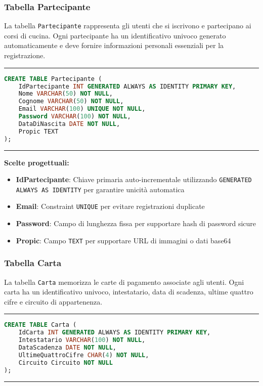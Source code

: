 \subsubsection{Tabella Partecipante}

La tabella \texttt{Partecipante} rappresenta gli utenti che si iscrivono e partecipano ai corsi di cucina. Ogni partecipante ha un identificativo univoco generato automaticamente e deve fornire informazioni personali essenziali per la registrazione.

\noindent\rule{\textwidth}{0.4pt}
\begin{lstlisting}[language=SQL, style=sqlstyle]
CREATE TABLE Partecipante (
    IdPartecipante INT GENERATED ALWAYS AS IDENTITY PRIMARY KEY,
    Nome VARCHAR(50) NOT NULL,
    Cognome VARCHAR(50) NOT NULL,
    Email VARCHAR(100) UNIQUE NOT NULL,
    Password VARCHAR(100) NOT NULL,
    DataDiNascita DATE NOT NULL,
    Propic TEXT
);
\end{lstlisting}
\noindent\rule{\textwidth}{0.4pt}

\textbf{Scelte progettuali:}
\begin{itemize}
    \item \textbf{IdPartecipante}: Chiave primaria auto-incrementale utilizzando \texttt{GENERATED ALWAYS AS IDENTITY} per garantire unicità automatica
    \item \textbf{Email}: Constraint \texttt{UNIQUE} per evitare registrazioni duplicate
    \item \textbf{Password}: Campo di lunghezza fissa per supportare hash di password sicure
    \item \textbf{Propic}: Campo \texttt{TEXT} per supportare URL di immagini o dati base64
\end{itemize}

\subsubsection{Tabella Carta}

La tabella \texttt{Carta} memorizza le carte di pagamento associate agli utenti. Ogni carta ha un identificativo univoco, intestatario, data di scadenza, ultime quattro cifre e circuito di appartenenza.

\noindent\rule{\textwidth}{0.4pt}
\begin{lstlisting}[language=SQL, style=sqlstyle]
CREATE TABLE Carta (
    IdCarta INT GENERATED ALWAYS AS IDENTITY PRIMARY KEY,
    Intestatario VARCHAR(100) NOT NULL,
    DataScadenza DATE NOT NULL,
    UltimeQuattroCifre CHAR(4) NOT NULL,
    Circuito Circuito NOT NULL
);
\end{lstlisting}
\noindent\rule{\textwidth}{0.4pt}

